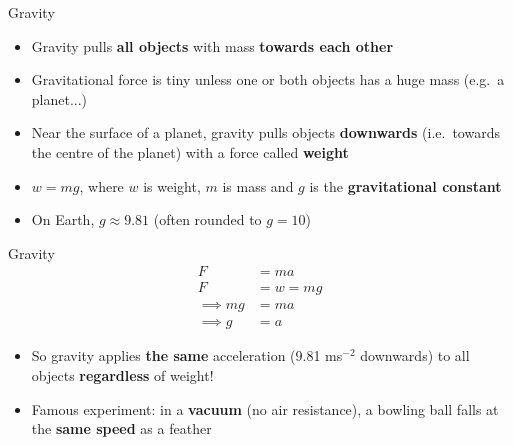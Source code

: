 \begin{frame}{Gravity}
	\begin{itemize}
		\pause\item Gravity pulls \textbf{all objects} with mass \textbf{towards each other}
		\pause\item Gravitational force is tiny unless one or both objects has a huge mass (e.g.\ a planet...)
		\pause\item Near the surface of a planet, gravity pulls objects \textbf{downwards} (i.e.\ towards the centre of the planet)
			with a force called \textbf{weight}
		\pause\item $w=mg$, where $w$ is weight, $m$ is mass and $g$ is the \textbf{gravitational constant}
		\pause\item On Earth, $g \approx 9.81$ (often rounded to $g = 10$)
	\end{itemize}
\end{frame}

\begin{frame}{Gravity}
	\begin{align*}
		F &= ma \\
		F &= w = mg \\
		\implies mg &= ma \\
		\implies g &= a
	\end{align*}
	\begin{itemize}
		\pause\item So gravity applies \textbf{the same} acceleration (9.81 ms$^{-2}$ downwards) to all objects \textbf{regardless} of weight!
		\pause\item Famous experiment: in a \textbf{vacuum} (no air resistance), a bowling ball falls at the \textbf{same speed} as a feather
	\end{itemize}
\end{frame}

